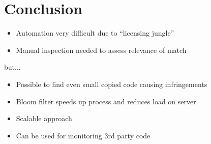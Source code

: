 
\section{Conclusion}


\begin{frame}{\insertsection}
	\begin{itemize}
		\small
		\item Automation very difficult due to ``licensing jungle''
		\item Manual inspection needed to assess relevance of match
	\end{itemize}
	but...
	\begin{itemize}
		\small
		\item Possible to find even small copied code causing infringements
		\item Bloom filter speeds up process and reduces load on server
		\item Scalable approach
		\item Can be used for monitoring 3rd party code
	\end{itemize}

\end{frame}